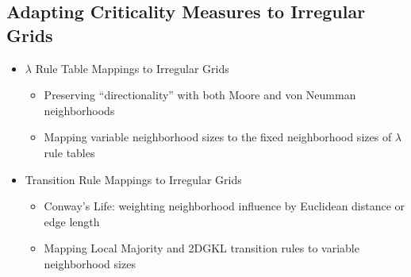 \documentclass[a4paper, 11pt]{article}
\begin{document}
\subsection*{Adapting Criticality Measures to Irregular Grids}
\begin{itemize}

\item $\lambda$ Rule Table Mappings to Irregular Grids
\begin{itemize}
\item Preserving ``directionality'' with both Moore and von Neumman neighborhoods
\item Mapping variable neighborhood sizes to the fixed neighborhood sizes of $\lambda$ rule tables
\end{itemize}

\item Transition Rule Mappings to Irregular Grids
\begin{itemize}
\item Conway's Life: weighting neighborhood influence by Euclidean distance or edge length
\item Mapping Local Majority and 2DGKL transition rules to variable neighborhood sizes
\end{itemize}

\end{itemize}
\end{document}

